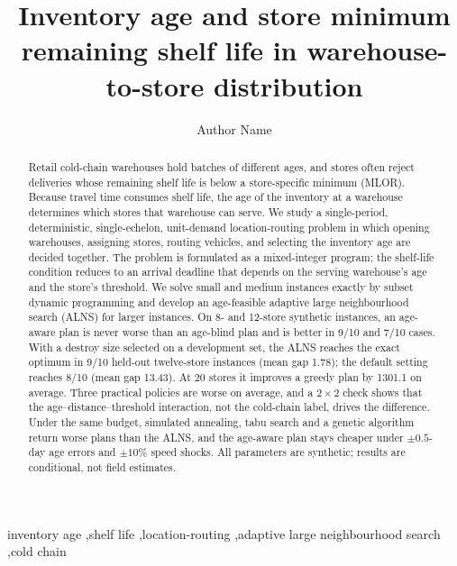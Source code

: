 \documentclass[preprint,12pt]{elsarticle}
\begin{document}
\begin{frontmatter}

\title{Inventory age and store minimum remaining shelf life in warehouse-to-store distribution}

\author{Author Name}
\address{Affiliation}

\begin{abstract}
Retail cold-chain warehouses hold batches of different ages, and stores often reject deliveries whose remaining shelf life is below a store-specific minimum (MLOR). Because travel time consumes shelf life, the age of the inventory at a warehouse determines which stores that warehouse can serve. We study a single-period, deterministic, single-echelon, unit-demand location-routing problem in which opening warehouses, assigning stores, routing vehicles, and selecting the inventory age are decided together. The problem is formulated as a mixed-integer program; the shelf-life condition reduces to an arrival deadline that depends on the serving warehouse's age and the store's threshold. We solve small and medium instances exactly by subset dynamic programming and develop an age-feasible adaptive large neighbourhood search (ALNS) for larger instances. On 8- and 12-store synthetic instances, an age-aware plan is never worse than an age-blind plan and is better in 9/10 and 7/10 cases. With a destroy size selected on a development set, the ALNS reaches the exact optimum in 9/10 held-out twelve-store instances (mean gap 1.78); the default setting reaches 8/10 (mean gap 13.43). At 20 stores it improves a greedy plan by 1301.1 on average. Three practical policies are worse on average, and a $2\times 2$ check shows that the age--distance--threshold interaction, not the cold-chain label, drives the difference. Under the same budget, simulated annealing, tabu search and a genetic algorithm return worse plans than the ALNS, and the age-aware plan stays cheaper under $\pm 0.5$-day age errors and $\pm 10\%$ speed shocks. All parameters are synthetic; results are conditional, not field estimates.
\end{abstract}

\begin{keyword}
inventory age \sep shelf life \sep location-routing \sep adaptive large neighbourhood search \sep cold chain
\end{keyword}

\end{frontmatter}
\end{document}
